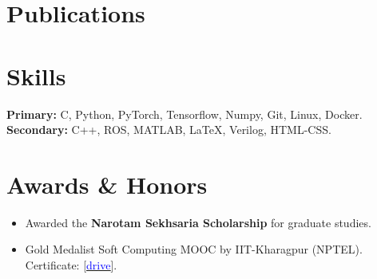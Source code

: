 \documentclass[10pt,letter,sans]{moderncv}        %
\begin{document}
\vspace{-0.7em}
\section{Publications}

\vspace{-2.75em}
\section{Skills}
\vspace{-0.5em}
\textbf{\large Primary:} C, Python, PyTorch, Tensorflow, Numpy, Git, Linux, Docker. \\
\textbf{\large Secondary:} C++, ROS, MATLAB, LaTeX, Verilog, HTML-CSS.

\vspace{-1.0em}
\section{Awards \& Honors}
\vspace{-0.5em}
\begin{itemize}
    \item[\textbullet] Awarded the \textbf{Narotam Sekhsaria Scholarship} for graduate studies.
    \item[\textbullet] Gold Medalist Soft Computing MOOC by IIT-Kharagpur (NPTEL). Certificate: [\href{https://drive.google.com/file/d/1dKUy8gFmk8qgwBTK5Nt_A5F2VZkxPQ9Y/view?usp=sharing}{\underline{\textcolor{blue}{drive}}}].
\end{itemize}


  
\end{document}
